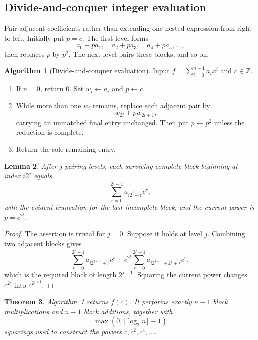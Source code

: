 \documentclass[11pt]{book}
\newtheorem{theorem}{Theorem}[section]
\newtheorem{lemma}[theorem]{Lemma}
\theoremstyle{definition}
\newtheorem{algorithm}[theorem]{Algorithm}
\newcommand{\ZZ}{\mathbb Z}
\begin{document}
\subsection{Divide-and-conquer integer evaluation}

Pair adjacent coefficients rather than extending one nested expression from
right to left.  Initially put $p=c$.  The first level forms
\[
 a_0+pa_1,\quad a_2+pa_3,\quad a_4+pa_5,\ldots,
\]
then replaces $p$ by $p^2$.  The next level pairs these blocks, and so on.

\begin{algorithm}[Divide-and-conquer evaluation]\label{alg:dc-evaluation}
Input $f=\sum_{i=0}^{n-1}a_ix^i$ and $c\in\ZZ$.
\begin{enumerate}
 \item If $n=0$, return $0$.  Set $w_i\leftarrow a_i$ and $p\leftarrow c$.
 \item While more than one $w_i$ remains, replace each adjacent pair by
 \[
    w_{2i}+p w_{2i+1},
 \]
 carrying an unmatched final entry unchanged.  Then put $p\leftarrow p^2$
 unless the reduction is complete.
 \item Return the sole remaining entry.
\end{enumerate}
\end{algorithm}

\begin{lemma}\label{lem:dc-evaluation-invariant}
After $j$ pairing levels, each surviving complete block beginning at index
$i2^j$ equals
\[
 \sum_{r=0}^{2^j-1} a_{i2^j+r}c^r,
\]
with the evident truncation for the last incomplete block, and the current
power is $p=c^{2^j}$.
\end{lemma}

\begin{proof}
The assertion is trivial for $j=0$.  Suppose it holds at level $j$.  Combining
two adjacent blocks gives
\[
 \sum_{r=0}^{2^j-1}a_{i2^{j+1}+r}c^r
 +c^{2^j}\sum_{r=0}^{2^j-1}
 a_{i2^{j+1}+2^j+r}c^r,
\]
which is the required block of length $2^{j+1}$.  Squaring the current power
changes $c^{2^j}$ into $c^{2^{j+1}}$.
\end{proof}

\begin{theorem}\label{thm:dc-evaluation}
Algorithm~\ref{alg:dc-evaluation} returns $f(c)$.  It performs exactly
$n-1$ block multiplications and $n-1$ block additions, together with
\[
 \max(0,\lceil\log_2 n\rceil-1)
\]
squarings used to construct the powers $c,c^2,c^4,\ldots$.
\end{theorem}
\end{document}
